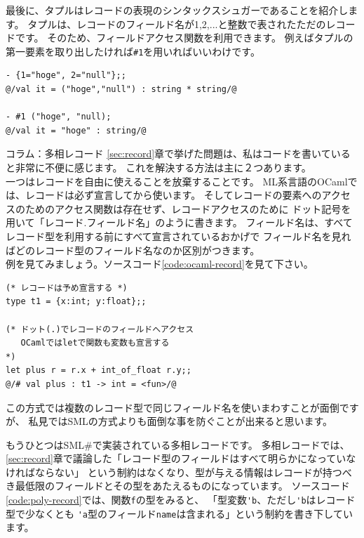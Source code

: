 \documentclass[11pt,a4paper]{article}
\begin{document}
最後に、タプルはレコードの表現のシンタックスシュガーであることを紹介します。
タプルは、レコードのフィールド名が1,2,...と整数で表されたただのレコードです。
そのため、フィールドアクセス関数を利用できます。
例えばタプルの第一要素を取り出したければ\lstinline{#1}を用いればいいわけです。

\begin{lstlisting}[caption=タプルはレコード,label=code:tuple-is-record]
- {1="hoge", 2="null"};;
@/val it = ("hoge","null") : string * string/@

- #1 ("hoge", "null);
@/val it = "hoge" : string/@
\end{lstlisting}

\begin{itembox}[l]{コラム：多相レコード}
  \ref{sec:record}章で挙げた問題は、私はコードを書いていると非常に不便に感じます。
  これを解決する方法は主に２つあります。\\
  一つはレコードを自由に使えることを放棄することです。
  ML系言語のOCaml\cite{ocaml}では、レコードは必ず宣言してから使います。
  そしてレコードの要素へのアクセスのためのアクセス関数は存在せず、レコードアクセスのために
  ドット記号を用いて「レコード.フィールド名」のように書きます。
  フィールド名は、すべてレコード型を利用する前にすべて宣言されているおかげで
  フィールド名を見ればどのレコード型のフィールド名なのか区別がつきます。\\
  例を見てみましょう。ソースコード\ref{code:ocaml-record}を見て下さい。

\begin{lstlisting}[caption=OCamlにおけるレコード,label=code:ocaml-record]
(* レコードは予め宣言する *)
type t1 = {x:int; y:float};;

(* ドット(.)でレコードのフィールドへアクセス
   OCamlではletで関数も変数も宣言する
*)
let plus r = r.x + int_of_float r.y;;
@/# val plus : t1 -> int = <fun>/@
\end{lstlisting}

  この方式では複数のレコード型で同じフィールド名を使いまわすことが面倒ですが、
  私見ではSMLの方式よりも面倒な事を防ぐことが出来ると思います。

  もうひとつはSML\#\cite{smlsharp}で実装されている多相レコードです。
  多相レコードでは、\ref{sec:record}章で議論した「レコード型のフィールドはすべて明らかになっていなければならない」
  という制約はなくなり、型が与える情報はレコードが持つべき最低限のフィールドとその型をあたえるものになっています。
  ソースコード\ref{code:poly-record}では、関数\lstinline{f}の型をみると、
  「型変数\lstinline{'b}、ただし\lstinline{'b}はレコード型で少なくとも
  \lstinline{'a}型のフィールド\lstinline{name}は含まれる」という制約を書き下しています。


\end{itembox}
\end{document}
